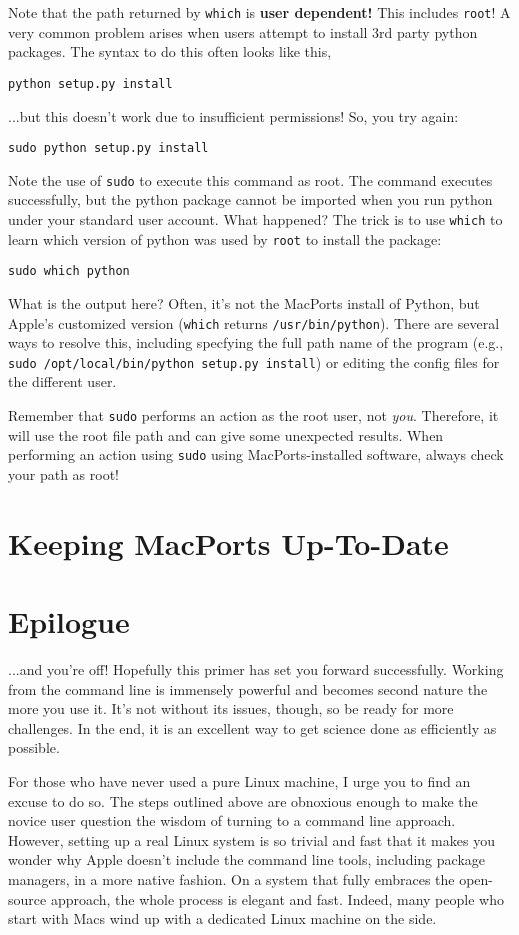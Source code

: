\documentclass[12pt, letterpaper]{article}
\begin{document}
Note that the path returned by {\tt which} is \textbf{user dependent!}  This
includes {\tt root}!  A very common problem arises when users attempt to install
3rd party python packages.  The syntax to do this often looks like this,
\begin{verbatim}
python setup.py install
\end{verbatim}
...but this doesn't work due to insufficient permissions!  So, you try again:
\begin{verbatim}
sudo python setup.py install
\end{verbatim}
Note the use of {\tt sudo} to execute this command as root.  The command
executes successfully, but the python package cannot be imported when you run
python under your standard user account.  What happened?  The trick is to use
{\tt which} to learn which version of python was used by {\tt root} to install
the package:
\begin{verbatim}
sudo which python
\end{verbatim}
What is the output here?  Often, it's not the MacPorts install of Python, but
Apple's customized version ({\tt which} returns {\tt /usr/bin/python}).  There
are several ways to resolve this, including specfying the full path name of
the program (e.g., {\tt sudo /opt/local/bin/python setup.py install}) or editing
the config files for the different user.

\begin{tcolorbox}[title=\textbf{Rooting Out Path Problems}]
  Remember that {\tt sudo} performs an action as the root user, not \emph{you}.
  Therefore, it will use the root file path and can give some unexpected
  results.
  When performing an action using {\tt sudo} using MacPorts-installed
  software, always check your path as root!
\end{tcolorbox}

\section{Keeping MacPorts Up-To-Date}



\section{Epilogue}
...and you're off!  Hopefully this primer has set you forward successfully.
Working from the command line is immensely powerful and becomes second nature
the more you use it.  It's not without its issues, though, so be ready for
more challenges.  In the end, it is an excellent way to get science done as
efficiently as possible.

For those who have never used a pure Linux machine, I urge you to find an
excuse to do so.  The steps outlined above are obnoxious enough to make
the novice user question the wisdom of turning to a command line approach.
However, setting up a real Linux system is so trivial and fast that it makes
you wonder why Apple doesn't include the command line tools, including package
managers, in a more native fashion.  On a system that fully embraces the
open-source approach, the whole process is elegant and fast.  Indeed, many
people who start with Macs wind up with a dedicated Linux machine on the side.
\end{document}
